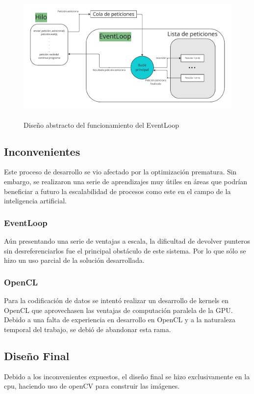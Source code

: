 \begin{figure}[H]
    \centering
    \includegraphics[height=250px]{images/EventLoop.pdf}
    \caption{Diseño abstracto del funcionamiento del EventLoop}
    \label{diagramaEventLoop}
\end{figure}

\subsection{Inconvenientes}
Este proceso de desarrollo se vio afectado por la optimización prematura. Sin embargo, se realizaron una serie de aprendizajes muy útiles en áreas que podrían beneficiar a futuro la escalabilidad de procesos como este en el campo de la inteligencia artificial.
\subsubsection{EventLoop}
Aún presentando una serie de ventajas a escala, la dificultad de devolver punteros sin desreferenciarlos fue el principal obstáculo de este sistema. Por lo que sólo se hizo un uso parcial de la solución desarrollada. 
\subsubsection{OpenCL}
Para la codificación de datos se intentó realizar un desarrollo de kernels en OpenCL que aprovechasen las ventajas de computación paralela de la GPU. Debido a una falta de experiencia en desarrollo en OpenCL y a la naturaleza temporal del trabajo, se debió de abandonar esta rama.

\subsection{Diseño Final}
Debido a los inconvenientes expuestos, el diseño final se hizo exclusivamente en la cpu, haciendo uso de openCV para construir las imágenes.


